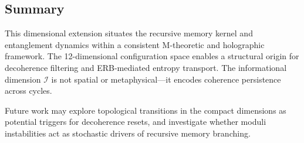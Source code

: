 \subsection*{Summary}

This dimensional extension situates the recursive memory kernel and entanglement dynamics within a consistent M-theoretic and holographic framework. The 12-dimensional configuration space enables a structural origin for decoherence filtering and ERB-mediated entropy transport. The informational dimension \( \mathcal{I} \) is not spatial or metaphysical—it encodes coherence persistence across cycles.

Future work may explore topological transitions in the compact dimensions as potential triggers for decoherence resets, and investigate whether moduli instabilities act as stochastic drivers of recursive memory branching.
